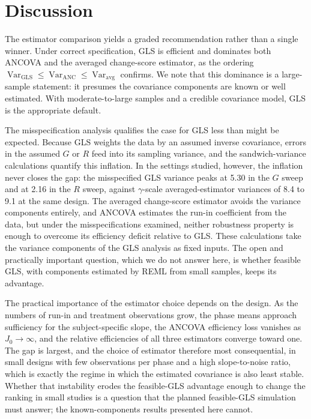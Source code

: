 \documentclass[
  11pt,
]{article}
\begin{document}
\section{Discussion}\label{discussion}

The estimator comparison yields a graded recommendation
rather than a single winner. Under correct specification,
GLS is efficient and dominates both ANCOVA and the
averaged change-score estimator, as the ordering
\(\mathop{\mathrm{Var}}_{\text{GLS}} \le \mathop{\mathrm{Var}}_{\text{ANC}} \le
\mathop{\mathrm{Var}}_{\text{avg}}\) confirms. We note that this dominance
is a large-sample statement: it presumes the covariance
components are known or well estimated. With
moderate-to-large samples and a credible covariance
model, GLS is the appropriate default.

The misspecification analysis qualifies the case for GLS
less than might be expected. Because GLS weights the
data by an assumed inverse covariance, errors in the
assumed \(G\) or \(R\) feed into its sampling variance, and
the sandwich-variance calculations quantify this
inflation. In the settings studied, however, the
inflation never closes the gap: the misspecified GLS
variance peaks at 5.30 in the \(G\) sweep and at 2.16 in
the \(R\) sweep, against \(\gamma\)-scale averaged-estimator
variances of 8.4 to 9.1 at the same design. The averaged
change-score estimator avoids the variance components
entirely, and ANCOVA estimates the run-in coefficient
from the data, but under the misspecifications examined,
neither robustness property is enough to overcome its
efficiency deficit relative to GLS. These calculations
take the variance components of the GLS analysis as
fixed inputs. The open and practically important
question, which we do not answer here, is whether
feasible GLS, with components estimated by REML from
small samples, keeps its advantage.

The practical importance of the estimator choice depends
on the design. As the numbers of run-in and treatment
observations grow, the phase means approach sufficiency
for the subject-specific slope, the ANCOVA efficiency
loss vanishes as \(J_0 \to \infty\), and the relative
efficiencies of all three estimators converge toward
one. The gap is largest, and the choice of estimator
therefore most consequential, in small designs with few
observations per phase and a high slope-to-noise ratio,
which is exactly the regime in which the estimated
covariance is also least stable. Whether that
instability erodes the feasible-GLS advantage enough to
change the ranking in small studies is a question that
the planned feasible-GLS simulation must answer; the
known-components results presented here cannot.
\end{document}
